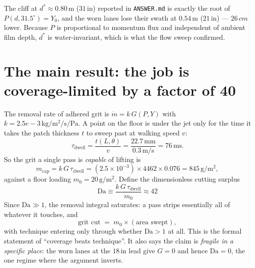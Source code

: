 \documentclass[11pt,a4paper]{article}
\newcommand{\SI}[2]{\ensuremath{#1\,#2}}
\newcommand{\ang}[1]{\ensuremath{#1^{\circ}}}
\newcommand{\per}{\ensuremath{/}}
\newcommand{\squared}[1]{\ensuremath{#1^{2}}}
\newcommand{\metre}{\ensuremath{\mathrm{m}}}
\newcommand{\second}{\ensuremath{\mathrm{s}}}
\newcommand{\gram}{\ensuremath{\mathrm{g}}}
\newcommand{\kilogram}{\ensuremath{\mathrm{kg}}}
\newcommand{\pascal}{\ensuremath{\mathrm{Pa}}}
\newcommand{\milli}{\ensuremath{\mathrm{m}}}
\begin{document}
The cliff at $d^{*}\approx\SI{0.80}{\metre}$ ($\SI{31}{\mathrm{in}}$) reported in
\texttt{ANSWER.md} is exactly the root of $P(d,\ang{31.5})=Y_{0}$, and the worn
lanes lose their swath at $\SI{0.54}{\metre}$ ($\SI{21}{\mathrm{in}}$) --- \SI{26}{cm}
lower. Because $P$ is proportional to momentum flux and independent of ambient
film depth, $d^{*}$ is water-invariant, which is what the flow sweep confirmed.

\section{The main result: the job is coverage-limited by a factor of 40}

The removal rate of adhered grit is $\dot{m} = k\,G(P,Y)$ with
$k=\SI{2.5e-3}{\kilogram\per\squared{\metre}\per\second\per\pascal}$. A point on
the floor is under the jet only for the time it takes the patch thickness $t$
to sweep past at walking speed $v$:
\begin{equation}
  \tau_{\text{dwell}} = \frac{t(L,\theta)}{v}
  = \frac{\SI{22.7}{\milli\metre}}{\SI{0.3}{\metre\per\second}} = \SI{76}{\milli\second}.
\end{equation}
So the grit a single pass is \emph{capable} of lifting is
\begin{equation}
  m_{\text{cap}} = k\,G\,\tau_{\text{dwell}}
  = (2.5\times10^{-3})\times 4462 \times 0.076
  = \SI{845}{\gram\per\squared{\metre}},
\end{equation}
against a floor loading $m_{0}=\SI{20}{\gram\per\squared{\metre}}$. Define the
dimensionless cutting surplus
\begin{equation}
  \boxed{\;\mathrm{Da} \equiv \frac{k\,G\,\tau_{\text{dwell}}}{m_{0}} \approx 42 \;}
\end{equation}
Since $\mathrm{Da}\gg1$, the removal integral saturates: a pass strips
essentially all of whatever it touches, and
\begin{equation}
  \text{grit cut} \;=\; m_{0}\times(\text{area swept}),
\end{equation}
with technique entering only through whether $\mathrm{Da}>1$ at all. This is the
formal statement of ``coverage beats technique''. It also says the claim is
\emph{fragile in a specific place}: the worn lanes at the \SI{18}{\mathrm{in}} lead give
$G=0$ and hence $\mathrm{Da}=0$, the one regime where the argument inverts.
\end{document}

